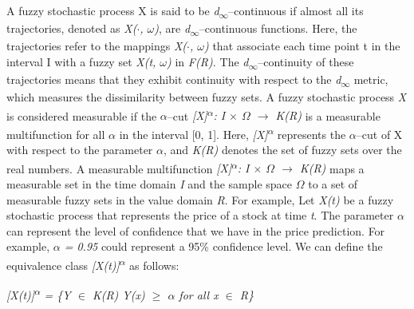 \documentclass[12pt,a4paper]{report}
\numberwithin{equation}{section}
\begin{document}
A fuzzy stochastic process X is said to be
\emph{d\textsubscript{$\infty$}}--continuous if almost all its trajectories,
denoted as \emph{X($\cdot$, $\omega$)}, are \emph{d\textsubscript{$\infty$}}--continuous
functions. Here, the trajectories refer to the mappings \emph{X($\cdot$, $\omega$)}
that associate each time point t in the interval I with a fuzzy set
\emph{X(t, $\omega$)} in \emph{F(R).} The \emph{d\textsubscript{$\infty$}}--continuity
of these trajectories means that they exhibit continuity with respect to
the \emph{d\textsubscript{$\infty$}} metric, which measures the dissimilarity
between fuzzy sets. A fuzzy stochastic process \emph{X} is considered
measurable if the $\alpha$--cut
\emph{{[}X{]}\textsuperscript{$\alpha$}: I $\times$ $\Omega$ $\rightarrow$ K(R)} is a measurable
multifunction for all \emph{$\alpha$} in the interval {[}0, 1{]}. Here,
\emph{{[}X{]}\textsuperscript{$\alpha$}} represents the $\alpha$--cut  of X with respect to the parameter \emph{$\alpha$}, and \emph{K(R)}
denotes the set of fuzzy sets over the real numbers. A measurable
multifunction \emph{{[}X{]}\textsuperscript{$\alpha$}: I $\times$ $\Omega$ $\rightarrow$ K(R)} maps a
measurable set in the time domain \emph{I} and the sample space \emph{$\Omega$}
to a set of measurable fuzzy sets in the value domain \emph{R}. For
example, Let \emph{X(t)} be a fuzzy stochastic process that represents
the price of a stock at time \emph{t}. The parameter $\alpha$ can represent the
level of confidence that we have in the price prediction. For example,
\emph{$\alpha$ = 0.95} could represent a 95\% confidence level. We can define
the equivalence class \emph{{[}X(t){]}\textsuperscript{$\alpha$}} as follows:

\emph{{[}X(t){]}\textsuperscript{$\alpha$} = \{Y $\in$ K(R) \textbar{} Y(x) $\geq$ $\alpha$ for
all x $\in$ R\}}
\end{document}

